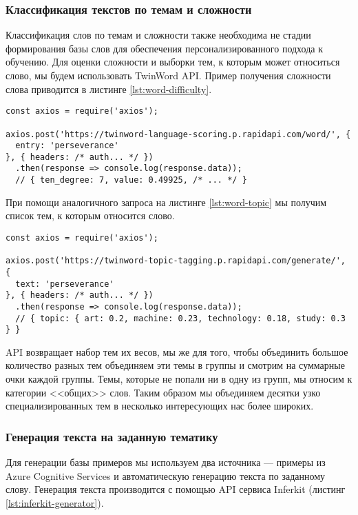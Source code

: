 \subsubsection{Классификация текстов по темам и сложности}
Классификация слов по темам и сложности также необходима не стадии формирования базы слов для обеспечения персонализированного подхода к обучению. Для оценки сложности и выборки тем, к которым может относиться слово, мы будем использовать TwinWord API\cite{twinword-overview}. Пример получения сложности слова приводится в листинге \ref{lst:word-difficulty}.

\begin{lstlisting}[basicstyle=\fontsize{11}{11}\selectfont,tabsize=4,breaklines=true,caption={Пример получения сложности слова.},captionpos=b,label={lst:word-difficulty}]
const axios = require('axios');

axios.post('https://twinword-language-scoring.p.rapidapi.com/word/', {
  entry: 'perseverance'
}, { headers: /* auth... */ })
  .then(response => console.log(response.data));
  // { ten_degree: 7, value: 0.49925, /* ... */ }
\end{lstlisting}

При помощи аналогичного запроса на листинге \ref{lst:word-topic} мы получим список тем, к которым относится слово.

\begin{lstlisting}[basicstyle=\fontsize{11}{11}\selectfont,tabsize=4,breaklines=true,caption={Пример получения тем, к которым относится слово.},captionpos=b,label={lst:word-topic}]
const axios = require('axios');

axios.post('https://twinword-topic-tagging.p.rapidapi.com/generate/', {
  text: 'perseverance'
}, { headers: /* auth... */ })
  .then(response => console.log(response.data));
  // { topic: { art: 0.2, machine: 0.23, technology: 0.18, study: 0.3 } }
\end{lstlisting}

API возвращает набор тем их весов, мы же для того, чтобы объединить большое количество разных тем объединяем эти темы в группы и смотрим на суммарные очки каждой группы. Темы, которые не попали ни в одну из групп, мы относим к категории <<общих>> слов. Таким образом мы объединяем десятки узко специализированных тем в несколько интересующих нас более широких.

\subsubsection{Генерация текста на заданную тематику}
Для генерации базы примеров мы используем два источника --- примеры из Azure Cognitive Services и автоматическую генерацию текста по заданному слову. Генерация текста производится с помощью API сервиса Inferkit (листинг \ref{lst:inferkit-generator}).

